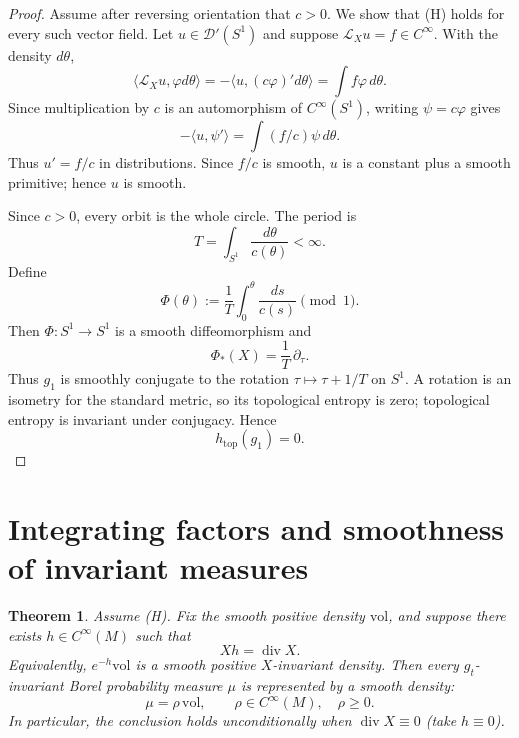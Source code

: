 \documentclass[12pt]{article}
\newtheorem{theorem}{Theorem}[section]
\theoremstyle{definition}
\newcommand{\D}{\mathcal{D}}
\newcommand{\vol}{\mathrm{vol}}
\DeclareMathOperator{\Div}{div}
\begin{document}
\begin{proof}
Assume after reversing orientation that \(c>0\).  We show that (H) holds for every such vector field.  Let \(u\in\D'(S^1)\) and suppose \(\mathcal L_X u=f\in C^\infty\).  With the density \(d\theta\),
\[
\langle \mathcal L_X u,\varphi d\theta\rangle
=
-\langle u,(c\varphi)'d\theta\rangle
=
\int f\varphi\,d\theta .
\]
Since multiplication by \(c\) is an automorphism of \(C^\infty(S^1)\), writing \(\psi=c\varphi\) gives
\[
-\langle u,\psi'\rangle
=
\int (f/c)\psi\,d\theta .
\]
Thus \(u'=f/c\) in distributions.  Since \(f/c\) is smooth, \(u\) is a constant plus a smooth primitive; hence \(u\) is smooth.

Since \(c>0\), every orbit is the whole circle.  The period is
\[
T=\int_{S^1}\frac{d\theta}{c(\theta)}<\infty .
\]
Define
\[
\Phi(\theta):=\frac1T\int_0^\theta \frac{ds}{c(s)}\pmod 1.
\]
Then \(\Phi:S^1\to S^1\) is a smooth diffeomorphism and
\[
\Phi_*(X)=\frac1T\,\partial_\tau .
\]
Thus \(g_1\) is smoothly conjugate to the rotation \(\tau\mapsto \tau+1/T\) on \(S^1\).  A rotation is an isometry for the standard metric, so its topological entropy is zero; topological entropy is invariant under conjugacy.  Hence
\[
h_{\mathrm{top}}(g_1)=0.
\]
\end{proof}

\section{Integrating factors and smoothness of invariant measures}
\label{sec:integrating}

\begin{theorem}\label{thm:integrating}
Assume (H).  Fix the smooth positive density \(\vol\), and suppose there exists \(h\in C^\infty(M)\) such that
\[
Xh=\Div X .
\]
Equivalently, \(e^{-h}\vol\) is a smooth positive \(X\)-invariant density.  Then every \(g_t\)-invariant Borel probability measure \(\mu\) is represented by a smooth density:
\[
\mu=\rho\,\vol,\qquad \rho\in C^\infty(M),\quad \rho\ge 0.
\]
In particular, the conclusion holds unconditionally when \(\Div X\equiv 0\) (take \(h\equiv 0\)).
\end{theorem}
\end{document}
